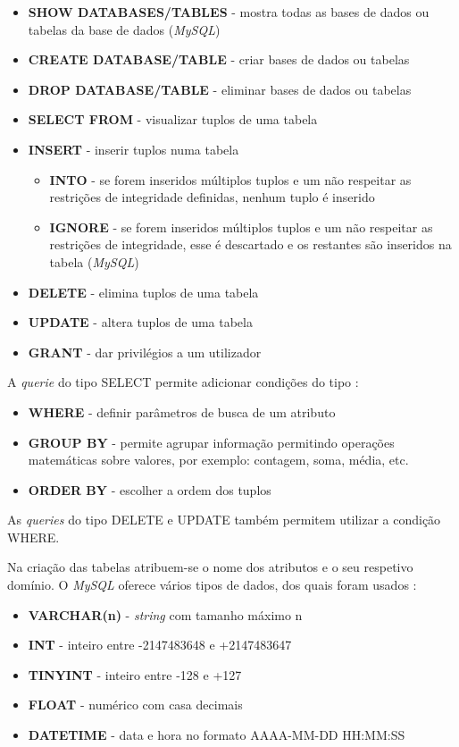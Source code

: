 \documentclass[11pt,twoside,a4paper]{report}
\begin{document}
\begin{itemize}
	\item \textbf{SHOW DATABASES/TABLES} - mostra todas as bases de dados ou tabelas da base de dados (\textit{MySQL})
	\item \textbf{CREATE DATABASE/TABLE} - criar bases de dados ou tabelas
	\item \textbf{DROP DATABASE/TABLE} - eliminar bases de dados ou tabelas
	\item \textbf{SELECT FROM} - visualizar tuplos de uma tabela
	\item \textbf{INSERT} - inserir tuplos numa tabela
	\begin{itemize}
		\item \textbf{INTO} - se forem inseridos múltiplos tuplos e um não respeitar as restrições de integridade definidas, nenhum tuplo é inserido
		\item \textbf{IGNORE} - se forem inseridos múltiplos tuplos e um não respeitar as restrições de integridade, esse é descartado e os restantes são inseridos na tabela (\textit{MySQL})
	\end{itemize}
	\item \textbf{DELETE} - elimina tuplos de uma tabela
	\item \textbf{UPDATE} - altera tuplos de uma tabela
	\item \textbf{GRANT} - dar privilégios a um utilizador
\end{itemize}
A \textit{querie} do tipo SELECT permite adicionar condições do tipo \cite{mysql}:
\begin{itemize}
	\item \textbf{WHERE} - definir parâmetros de busca de um atributo
	\item \textbf{GROUP BY} - permite agrupar informação permitindo operações matemáticas sobre valores, por exemplo: contagem, soma, média, etc.
	\item \textbf{ORDER BY} - escolher a ordem dos tuplos
\end{itemize}
As \textit{queries} do tipo DELETE e UPDATE  também permitem utilizar a condição WHERE.\par 
Na criação das tabelas atribuem-se o nome dos atributos e o seu respetivo domínio. O \textit{MySQL} oferece vários tipos de dados, dos quais foram usados \cite{mysql}:
\begin{itemize}
	\item \textbf{VARCHAR(n)} - \textit{string} com tamanho máximo n
	\item \textbf{INT} - inteiro entre -2147483648 e +2147483647
	\item \textbf{TINYINT} - inteiro entre -128 e +127
	\item \textbf{FLOAT} - numérico com casa decimais
	\item \textbf{DATETIME} - data e hora no formato AAAA-MM-DD HH:MM:SS
\end{itemize}
\end{document}
